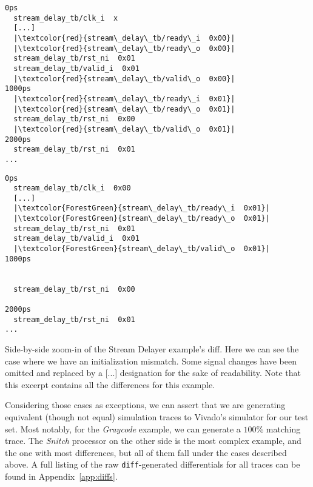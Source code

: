 \begin{listing}
  \lstset{
    escapeinside=||,
    basicstyle=\footnotesize\ttfamily,
    stepnumber=1
  }
  \begin{minipage}{0.45\textwidth}
    \begin{lstlisting}
0ps
  stream_delay_tb/clk_i  x
  [...]
  |\textcolor{red}{stream\_delay\_tb/ready\_i  0x00}|
  |\textcolor{red}{stream\_delay\_tb/ready\_o  0x00}|
  stream_delay_tb/rst_ni  0x01
  stream_delay_tb/valid_i  0x01
  |\textcolor{red}{stream\_delay\_tb/valid\_o  0x00}|
1000ps
  |\textcolor{red}{stream\_delay\_tb/ready\_i  0x01}|
  |\textcolor{red}{stream\_delay\_tb/ready\_o  0x01}|
  stream_delay_tb/rst_ni  0x00
  |\textcolor{red}{stream\_delay\_tb/valid\_o  0x01}|
2000ps
  stream_delay_tb/rst_ni  0x01
...
        \end{lstlisting}
  \end{minipage}
  \hfill
  \begin{minipage}{0.45\textwidth}
    \begin{lstlisting}
0ps
  stream_delay_tb/clk_i  0x00
  [...]
  |\textcolor{ForestGreen}{stream\_delay\_tb/ready\_i  0x01}|
  |\textcolor{ForestGreen}{stream\_delay\_tb/ready\_o  0x01}|
  stream_delay_tb/rst_ni  0x01
  stream_delay_tb/valid_i  0x01
  |\textcolor{ForestGreen}{stream\_delay\_tb/valid\_o  0x01}|
1000ps


  stream_delay_tb/rst_ni  0x00

2000ps
  stream_delay_tb/rst_ni  0x01
...
        \end{lstlisting}
  \end{minipage}
  \caption[Side-by-side zoom-in of the Stream Delayer example's diff.]{Side-by-side zoom-in of the Stream Delayer example's diff. Here we can see the case where we have an initialization mismatch. Some signal changes have been omitted and replaced by a [...] designation for the sake of readability. Note that this excerpt contains all the differences for this example.}
  \label{listing:diff-sd}
\end{listing}

Considering those cases as exceptions, we can assert that we are generating equivalent (though not equal) simulation traces to Vivado's simulator for our test set. Most notably, for the \textit{Graycode} example, we can generate a $100\%$ matching trace. The \textit{Snitch} processor on the other side is the most complex example, and the one with most differences, but all of them fall under the cases described above. A full listing of the raw \texttt{diff}-generated differentials for all traces can be found in Appendix~\ref{app:diffs}.

